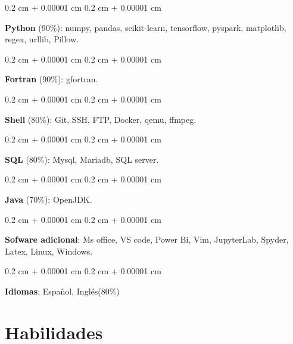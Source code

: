 \documentclass[10pt, letterpaper]{article}
\newenvironment{onecolentry}{
    \begin{adjustwidth}{
        0.2 cm + 0.00001 cm
    }{
        0.2 cm + 0.00001 cm
    }
}{
    \end{adjustwidth}
} %
\begin{document}
        \vspace{0.2 cm}

        \begin{onecolentry}
            \textbf{Python} (90\%):  numpy, pandas, scikit-learn, tensorflow, pyspark, matplotlib, regex, urllib, Pillow.
        \end{onecolentry}

        \vspace{0.1cm}
        
        \begin{onecolentry}
            \textbf{Fortran} (90\%):  gfortran.
        \end{onecolentry}
        \vspace{0.1cm}   
        
        \begin{onecolentry}
            \textbf{Shell} (80\%): Git, SSH, FTP, Docker, qemu, ffmpeg.
        \end{onecolentry}
        
        \vspace{0.1cm}        
                  
        \begin{onecolentry}
            \textbf{SQL} (80\%): Mysql, Mariadb, SQL server.
        \end{onecolentry}
        
        \vspace{0.1cm} 
        
        \begin{onecolentry}
            \textbf{Java} (70\%): OpenJDK.
        \end{onecolentry}
        

        \vspace{0.1cm}
        
        \begin{onecolentry}
            \textbf{Sofware adicional}: Ms office, VS code, Power Bi, Vim, JupyterLab, Spyder, Latex, Linux, Windows. 
        \end{onecolentry}
        
        \vspace{0.1cm}
        
        \begin{onecolentry}
            \textbf{Idiomas}: Español, Inglés(80\%)
        \end{onecolentry}


    \section{Habilidades}
\end{document}
